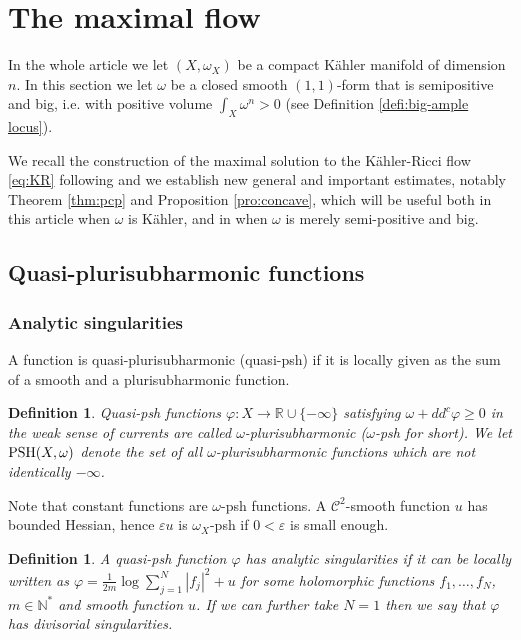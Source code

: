 \documentclass[11pt]{amsart}
\numberwithin{equation}{section}
\newtheorem{defi}[theorem]{Definition}
\newcommand{\PSH}{\textup{PSH}}
\newcommand{\R}{\mathbb R}
\newcommand{\N}{\mathbb N}
\newcommand{\f}{\varphi}
\newcommand \e {\varepsilon}
\begin{document}
\section{The maximal flow} \label{sec:maxflow}


In the whole article we let $(X,\omega_X)$ be a compact K\"ahler manifold of dimension $n$. 
In this section we let $\omega$ be a closed smooth $(1,1)$-form that is semipositive and big,
i.e. with positive volume $\int_X \omega^n>0$ (see Definition \ref{defi:big-ample locus}).

We recall the construction of the maximal solution to the K\"ahler-Ricci flow \eqref{eq:KR}
following \cite{GZ17,DNL17,Dan25} and we establish new general and important estimates,
notably Theorem \ref{thm:pcp} and Proposition \ref{pro:concave}, which will be useful
both in this article when $\omega$ is K\"ahler, and in \cite{DGL26} when 
$\omega$ is merely semi-positive and big.

 

\subsection{Quasi-plurisubharmonic functions}
 

\subsubsection*{Analytic singularities}


  A function is quasi-plurisub\-harmonic (quasi-psh) if it is locally given as the sum of  a smooth and a plurisubharmonic function.   
 
\begin{defi}
Quasi-psh functions
$\f:X \rightarrow \R \cup \{-\infty\}$ satisfying
$\omega+dd^c \f \geq 0$
in the weak sense of currents are called $\omega$-plurisubharmonic ($\omega$-psh for short).
We let $\PSH(X,\omega)$ denote the set of all $\omega$-plurisubharmonic functions which are not identically $-\infty$.  
\end{defi}

Note that constant functions are $\omega$-psh functions.
A ${\mathcal C}^2$-smooth function $u$ has bounded Hessian, hence $\e u$ is
$\omega_X$-psh if $0<\e$ is small enough.
 
 
\begin{defi}\label{defi:analsing} 
A quasi-psh function $\f$ has \emph{analytic singularities}
 if it can be locally written as 
$
\f=\frac{1}{2m}\log\sum_{j=1}^N|f_j|^2+u
$
for some holomorphic functions $f_1,\dots,f_N$, $m\in\N^*$ and smooth function $u$. 
If we can further take $N=1$ then we say that $\f$ has \emph{divisorial singularities}.
\end{defi}
\end{document}

